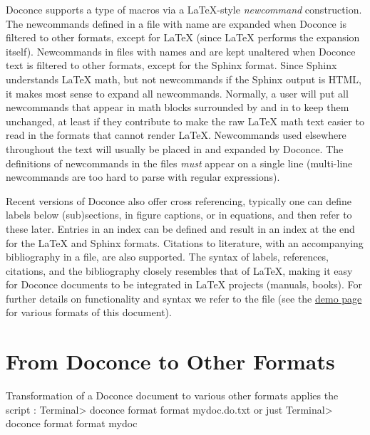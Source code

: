 \documentclass[%
oneside,                 %
final,                   %
chapterprefix=true,      %
open=right               %
10pt]{book}
\begin{document}
Doconce supports a type of macros via a LaTeX-style \emph{newcommand}
construction.  The newcommands defined in a file with name
 are expanded when Doconce is filtered to
other formats, except for {\LaTeX} (since {\LaTeX} performs the expansion
itself).  Newcommands in files with names  and
 are kept unaltered when Doconce text is
filtered to other formats, except for the Sphinx format. Since Sphinx
understands {\LaTeX} math, but not newcommands if the Sphinx output is
HTML, it makes most sense to expand all newcommands.  Normally, a user
will put all newcommands that appear in math blocks surrounded by
 and  in  to keep them unchanged, at
least if they contribute to make the raw {\LaTeX} math text easier to
read in the formats that cannot render {\LaTeX}.  Newcommands used
elsewhere throughout the text will usually be placed in
 and expanded by Doconce.  The definitions of
newcommands in the  files \emph{must} appear on a single
line (multi-line newcommands are too hard to parse with regular
expressions).

Recent versions of Doconce also offer cross referencing, typically one
can define labels below (sub)sections, in figure captions, or in
equations, and then refer to these later. Entries in an index can be
defined and result in an index at the end for the {\LaTeX} and Sphinx
formats. Citations to literature, with an accompanying bibliography in
a file, are also supported. The syntax of labels, references,
citations, and the bibliography closely resembles that of {\LaTeX},
making it easy for Doconce documents to be integrated in {\LaTeX}
projects (manuals, books). For further details on functionality and
syntax we refer to the  file (see the
\href{{https://doconce.googlecode.com/hg/doc/demos/manual/index.html}}{demo page}
for various formats of this document).




\section{From Doconce to Other Formats}

\label{doconce2formats}

Transformation of a Doconce document  to various other
formats applies the script :
\bsys
Terminal> doconce format format mydoc.do.txt
\esys
or just
\bsys
Terminal> doconce format format mydoc
\esys
\end{document}
